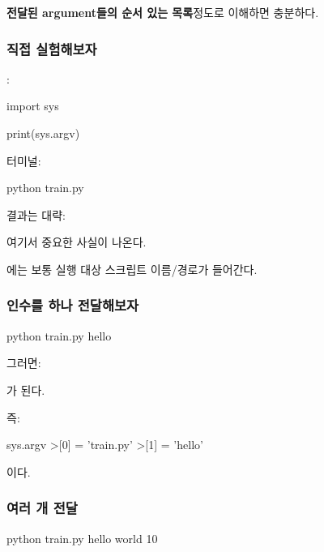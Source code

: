 \textbf{전달된 argument들의 순서 있는 목록}정도로 이해하면 충분하다.

\subsubsection{직접 실험해보자}

:

\begin{dhkcode}
import sys

print(sys.argv)
\end{dhkcode}

터미널:

\begin{dhkzsh}
python train.py
\end{dhkzsh}

결과는 대략:

\begin{dhkzsh}
['train.py']
\end{dhkzsh}

여기서 중요한 사실이 나온다.

에는 보통 실행 대상 스크립트 이름/경로가 들어간다.

\subsubsection{인수를 하나 전달해보자}

\begin{dhkzsh}
python train.py hello
\end{dhkzsh}

그러면:

\begin{dhkzsh}
\end{dhkzsh}

가 된다.

즉:

\begin{dhkdir}
sys.argv
>[0] = 'train.py'
>[1] = 'hello'
\end{dhkdir}

이다.

\subsubsection{여러 개 전달}

\begin{dhkzsh}
python train.py hello world 10
\end{dhkzsh}

